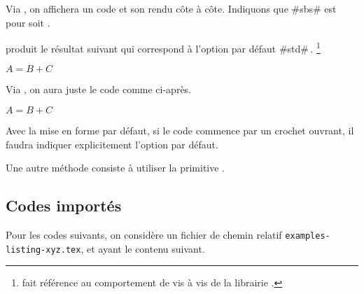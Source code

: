 \begin{tdocexa}
    Via , on affichera un code et son rendu côte à côte.
    Indiquons que \tdoclatexin#sbs# est pour  soit .

\end{tdocexa}


\begin{tdocexa}[À la suite]
     produit le résultat suivant qui correspond à l'option par défaut \tdoclatexin#std#\,.
    \footnote{
         fait référence au comportement  de  vis à vis de la librairie .
    }

    \begin{tdoclatex}
        $A = B + C$
    \end{tdoclatex}
\end{tdocexa}


\begin{tdocexa}
    Via , on aura juste le code comme ci-après.

    \begin{tdoclatex}[code]
        $A = B + C$
    \end{tdoclatex}
\end{tdocexa}


\begin{tdocwarn}
    Avec la mise en forme par défaut, si le code commence par un crochet ouvrant, il faudra indiquer explicitement l'option par défaut.


    \smallskip

    Une autre méthode consiste à utiliser la primitive .

\end{tdocwarn}


\subsection{Codes importés}

Pour les codes suivants, on considère un fichier de chemin relatif \verb+examples-listing-xyz.tex+, et ayant le contenu suivant.





